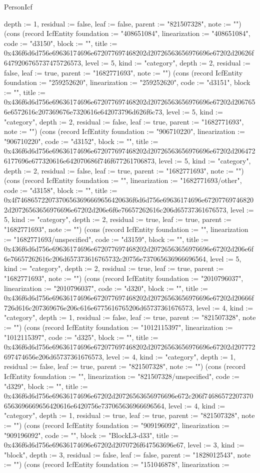 \begin{lexlean}{PersonIcf}
\begin{semanticmodule}
{depth := 1, residual := false, leaf := false, parent := "821507328", note := ""}) (cons (record IcfEntity {foundation := "408651084", linearization := "408651084", code := "d3150", block := "", title := 0x436f6d6d756e69636174696e672077697468202d20726563656976696e67202d20626f6479206765737475726573, level := 5, kind := "category", depth := 2, residual := false, leaf := true, parent := "1682771693", note := ""}) (cons (record IcfEntity {foundation := "259252620", linearization := "259252620", code := "d3151", block := "", title := 0x436f6d6d756e69636174696e672077697468202d20726563656976696e67202d2067656e6572616c207369676e7320616e642073796d626f6c73, level := 5, kind := "category", depth := 2, residual := false, leaf := true, parent := "1682771693", note := ""}) (cons (record IcfEntity {foundation := "906710220", linearization := "906710220", code := "d3152", block := "", title := 0x436f6d6d756e69636174696e672077697468202d20726563656976696e67202d2064726177696e677320616e642070686f746f677261706873, level := 5, kind := "category", depth := 2, residual := false, leaf := true, parent := "1682771693", note := ""}) (cons (record IcfEntity {foundation := "", linearization := "1682771693/other", code := "d3158", block := "", title := 0x4f746865722073706563696669656420636f6d6d756e69636174696e672077697468202d20726563656976696e67202d206e6f6e76657262616c206d65737361676573, level := 5, kind := "category", depth := 2, residual := true, leaf := true, parent := "1682771693", note := ""}) (cons (record IcfEntity {foundation := "", linearization := "1682771693/unspecified", code := "d3159", block := "", title := 0x436f6d6d756e69636174696e672077697468202d20726563656976696e67202d206e6f6e76657262616c206d657373616765732c20756e737065636966696564, level := 5, kind := "category", depth := 2, residual := true, leaf := true, parent := "1682771693", note := ""}) (cons (record IcfEntity {foundation := "2010796037", linearization := "2010796037", code := "d320", block := "", title := 0x436f6d6d756e69636174696e672077697468202d20726563656976696e67202d20666f726d616c207369676e206c616e6775616765206d65737361676573, level := 4, kind := "category", depth := 1, residual := false, leaf := true, parent := "821507328", note := ""}) (cons (record IcfEntity {foundation := "1012115397", linearization := "1012115397", code := "d325", block := "", title := 0x436f6d6d756e69636174696e672077697468202d20726563656976696e67202d207772697474656e206d65737361676573, level := 4, kind := "category", depth := 1, residual := false, leaf := true, parent := "821507328", note := ""}) (cons (record IcfEntity {foundation := "", linearization := "821507328/unspecified", code := "d329", block := "", title := 0x436f6d6d756e69636174696e67202d20726563656976696e672c206f746865722073706563696669656420616e6420756e737065636966696564, level := 4, kind := "category", depth := 1, residual := true, leaf := true, parent := "821507328", note := ""}) (cons (record IcfEntity {foundation := "909196092", linearization := "909196092", code := "", block := "BlockL3-d33", title := 0x436f6d6d756e69636174696e67202d2070726f647563696e67, level := 3, kind := "block", depth := 3, residual := false, leaf := false, parent := "1828012543", note := ""}) (cons (record IcfEntity {foundation := "151046878", linearization := }
\end{semanticmodule}
\end{lexlean}
